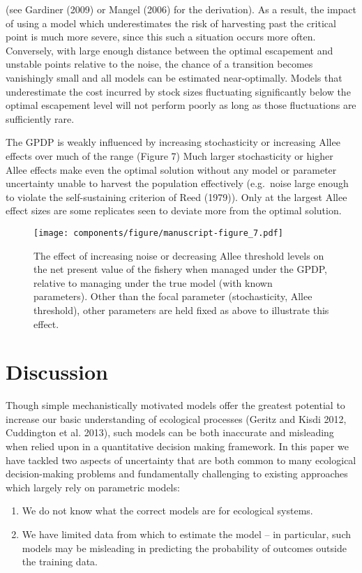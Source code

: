 \documentclass[author-year, 12pt,review]{components/elsarticle} %
\makeatletter
\def\maxwidth{\ifdim\Gin@nat@width>\linewidth\linewidth
\else\Gin@nat@width\fi}
\let\Oldincludegraphics\includegraphics
\renewcommand{\includegraphics}[1]{\Oldincludegraphics[width=\maxwidth]{#1}}
\makeatother
\begin{document}
(see Gardiner (2009) or Mangel (2006) for the derivation). As a result,
the impact of using a model which underestimates the risk of harvesting
past the critical point is much more severe, since this such a situation
occurs more often. Conversely, with large enough distance between the
optimal escapement and unstable points relative to the noise, the chance
of a transition becomes vanishingly small and all models can be
estimated near-optimally. Models that underestimate the cost incurred by
stock sizes fluctuating significantly below the optimal escapement level
will not perform poorly as long as those fluctuations are sufficiently
rare.

The GPDP is weakly influenced by increasing stochasticity or increasing
Allee effects over much of the range (Figure 7) Much larger
stochasticity or higher Allee effects make even the optimal solution
without any model or parameter uncertainty unable to harvest the
population effectively (e.g.~noise large enough to violate the
self-sustaining criterion of Reed (1979)). Only at the largest Allee
effect sizes are some replicates seen to deviate more from the optimal
solution.

\begin{figure}[htbp]
\centering
\texttt{[image: components/figure/manuscript-figure\_7.pdf]}
\caption{The effect of increasing noise or decreasing Allee threshold
levels on the net present value of the fishery when managed under the
GPDP, relative to managing under the true model (with known parameters).
Other than the focal parameter (stochasticity, Allee threshold), other
parameters are held fixed as above to illustrate this effect.}
\end{figure}

\section{Discussion}\label{discussion}

Though simple mechanistically motivated models offer the greatest
potential to increase our basic understanding of ecological processes
(Geritz and Kisdi 2012, Cuddington et al. 2013), such models can be both
inaccurate and misleading when relied upon in a quantitative decision
making framework. In this paper we have tackled two aspects of
uncertainty that are both common to many ecological decision-making
problems and fundamentally challenging to existing approaches which
largely rely on parametric models:

\begin{enumerate}
\def\labelenumi{\arabic{enumi}.}
\itemsep1pt\parskip0pt
\item
  We do not know what the correct models are for ecological systems.
\item
  We have limited data from which to estimate the model -- in
  particular, such models may be misleading in predicting the
  probability of outcomes outside the training data.
\end{enumerate}
\end{document}
